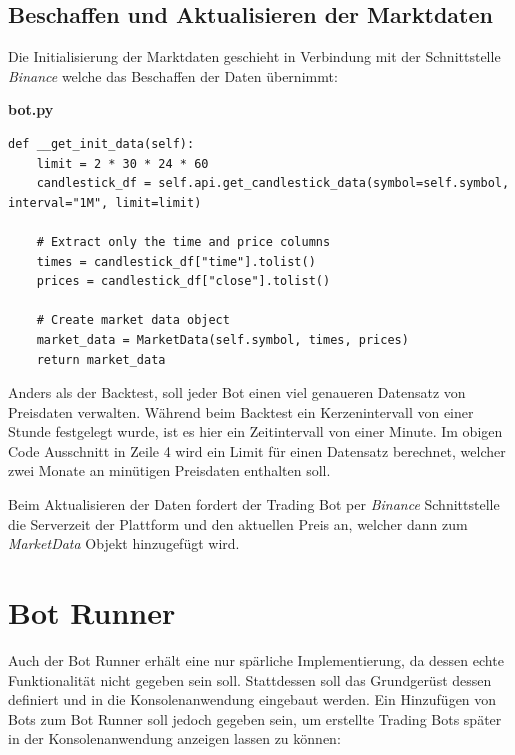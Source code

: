 \documentclass[oneside]{ausarbeitung}
\begin{document}
\subsection{Beschaffen und Aktualisieren der Marktdaten}
\label{sub:beschaffen_und_aktualisieren_der_marktdaten}

Die Initialisierung der Marktdaten geschieht in Verbindung mit der Schnittstelle \textit{Binance} welche das Beschaffen der Daten übernimmt:

\lstset{language=Python}
\lstset{frame=lines}
\lstset{basicstyle=\footnotesize}
\textbf{bot.py}
\begin{lstlisting}
def __get_init_data(self):
	limit = 2 * 30 * 24 * 60
	candlestick_df = self.api.get_candlestick_data(symbol=self.symbol, interval="1M", limit=limit)

	# Extract only the time and price columns
	times = candlestick_df["time"].tolist()
	prices = candlestick_df["close"].tolist()

	# Create market data object
	market_data = MarketData(self.symbol, times, prices)
	return market_data
\end{lstlisting}

Anders als der Backtest, soll jeder Bot einen viel genaueren Datensatz von Preisdaten verwalten. Während beim Backtest ein Kerzenintervall von einer Stunde festgelegt wurde, ist es hier ein Zeitintervall von einer Minute. Im obigen Code Ausschnitt in Zeile 4 wird ein Limit für einen Datensatz berechnet, welcher zwei Monate an minütigen Preisdaten enthalten soll.

Beim Aktualisieren der Daten fordert der Trading Bot per \textit{Binance} Schnittstelle die Serverzeit der Plattform und den aktuellen Preis an, welcher dann zum \textit{MarketData} Objekt hinzugefügt wird.


\section{Bot Runner}
\label{sec:bot_runner}

Auch der Bot Runner erhält eine nur spärliche Implementierung, da dessen echte Funktionalität nicht gegeben sein soll. Stattdessen soll das Grundgerüst dessen definiert und in die Konsolenanwendung eingebaut werden. Ein Hinzufügen von Bots zum Bot Runner soll jedoch gegeben sein, um erstellte Trading Bots später in der Konsolenanwendung anzeigen lassen zu können:
\end{document}
